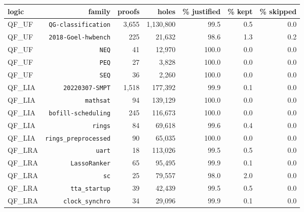 \begin{tabular}{lrrrrrr}
\toprule
logic & family & proofs & holes & \% justified & \% kept & \% skipped \\
\midrule
QF\_UF & \texttt{QG-classification} & 3,655 & 1,130,800 & 99.5 & 0.5 & 0.0 \\
QF\_UF & \texttt{2018-Goel-hwbench} & 225 & 21,632 & 98.6 & 1.3 & 0.2 \\
QF\_UF & \texttt{NEQ} & 41 & 12,970 & 100.0 & 0.0 & 0.0 \\
QF\_UF & \texttt{PEQ} & 27 & 3,828 & 100.0 & 0.0 & 0.0 \\
QF\_UF & \texttt{SEQ} & 36 & 2,260 & 100.0 & 0.0 & 0.0 \\
\midrule
QF\_LIA & \texttt{20220307-SMPT} & 1,518 & 177,392 & 99.9 & 0.1 & 0.0 \\
QF\_LIA & \texttt{mathsat} & 94 & 139,129 & 100.0 & 0.0 & 0.0 \\
QF\_LIA & \texttt{bofill-scheduling} & 245 & 116,673 & 100.0 & 0.0 & 0.0 \\
QF\_LIA & \texttt{rings} & 84 & 69,618 & 99.6 & 0.4 & 0.0 \\
QF\_LIA & \texttt{rings\_preprocessed} & 90 & 65,035 & 100.0 & 0.0 & 0.0 \\
\midrule
QF\_LRA & \texttt{uart} & 18 & 113,026 & 99.5 & 0.5 & 0.0 \\
QF\_LRA & \texttt{LassoRanker} & 65 & 95,495 & 99.9 & 0.1 & 0.0 \\
QF\_LRA & \texttt{sc} & 25 & 79,557 & 98.0 & 2.0 & 0.0 \\
QF\_LRA & \texttt{tta\_startup} & 39 & 42,439 & 99.5 & 0.5 & 0.0 \\
QF\_LRA & \texttt{clock\_synchro} & 34 & 29,096 & 99.9 & 0.1 & 0.0 \\
\bottomrule
\end{tabular}

